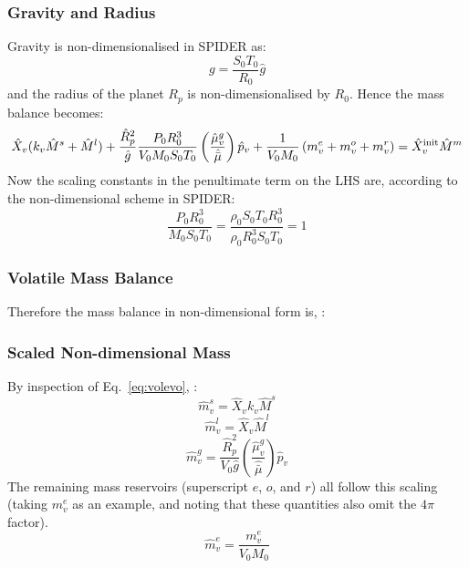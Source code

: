 \subsubsection{Gravity and Radius}
Gravity is non-dimensionalised in SPIDER as:
\begin{equation}
g = \frac{S_0 T_0}{R_0} \hat{g}
\end{equation}
and the radius of the planet $R_p$ is non-dimensionalised by $R_0$.  Hence the mass balance becomes:
\begin{equation}
\hat{X}_v (k_v \hat{M}^s + \hat{M}^l) + \frac{\hat{R}_p^2}{\hat{g}}\frac{P_0 R_0^3}{V_0 M_0 S_0 T_0} \left( \frac{\hat{\mu}_v^g}{\hat{\bar{\mu}}} \right) \hat{p}_v + \frac{1}{V_0 M_0} \left( m_v^e + m_v^o + m_v^r \right) = \hat{X}_v^{\rm init} \hat{M}^m
\end{equation}
Now the scaling constants in the penultimate term on the LHS are, according to the non-dimensional scheme in SPIDER:
\begin{equation}
\frac{P_0 R_0^3}{M_0 S_0 T_0} = \frac{\rho_0 S_0 T_0 R_0^3}{\rho_0 R_0^3 S_0 T_0} = 1
\end{equation}
\subsubsection{Volatile Mass Balance}
Therefore the mass balance in non-dimensional form is, :
\subsubsection{Scaled Non-dimensional Mass}
By inspection of Eq.~\ref{eq:volevo}, :
\begin{equation}
\hat{m}_v^s = \hat{X}_v k_v \hat{M}^s
\end{equation}
\begin{equation}
\hat{m}_v^l = \hat{X}_v \hat{M}^l
\end{equation}
\begin{equation}
\hat{m}_v^g = \frac{\hat{R}_p^2}{V_0 \hat{g}} \left( \frac{\hat{\mu}_v^g}{\hat{\bar{\mu}}} \right) \hat{p}_v
\end{equation}
The remaining mass reservoirs (superscript $e$, $o$, and $r$) all follow this scaling (taking $m_v^e$ as an example, and noting that these quantities also omit the $4 \pi$ factor).
\begin{equation}
\hat{m}_v^e = \frac{m_v^e}{V_0 M_0}
\end{equation}
